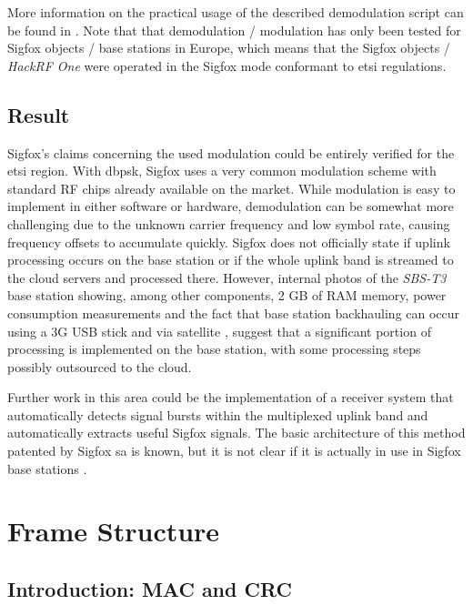 More information on the practical usage of the described demodulation script can be found in .
Note that that demodulation / modulation has only been tested for Sigfox objects / base stations in Europe, which means that the Sigfox objects / \textit{HackRF One} were operated in the Sigfox mode conformant to \gls{etsi} regulations.

\subsection{Result}
Sigfox's claims \cite[Section 5.1.1]{sigfox_ietf} concerning the used modulation could be entirely verified for the \gls{etsi} region.
With \gls{dbpsk}, Sigfox uses a very common modulation scheme with standard RF chips already available on the market.
While modulation is easy to implement in either software or hardware, demodulation can be somewhat more challenging due to the unknown carrier frequency and low symbol rate, causing frequency offsets to accumulate quickly.
Sigfox does not officially state if uplink processing occurs on the base station or if the whole uplink band is streamed to the cloud servers and processed there.
However, internal photos of the \textit{SBS-T3} base station \cite{sbst3_internal} showing, among other components, 2 GB of RAM memory, power consumption measurements \cite[Table 5.3]{chalmers} and the fact that base station backhauling can occur using a 3G USB stick \cite[Section 3.1, interfaces]{sbst3_manual} and via satellite \cite[Section 4.1.2.1]{chalmers}, suggest that a significant portion of processing is implemented on the base station, with some processing steps possibly outsourced to the cloud.

Further work in this area could be the implementation of a receiver system that automatically detects signal bursts within the multiplexed uplink band and automatically extracts useful Sigfox signals.
The basic architecture of this method patented by Sigfox \gls{sa} is known, but it is not clear if it is actually in use in Sigfox base stations \cite{patent_multiplexband}.

\FloatBarrier
\section{Frame Structure}
\label{sec:uplink_frameformat}
\subsection{Introduction: MAC and CRC}
\label{sec:uplink_mac_crc}
